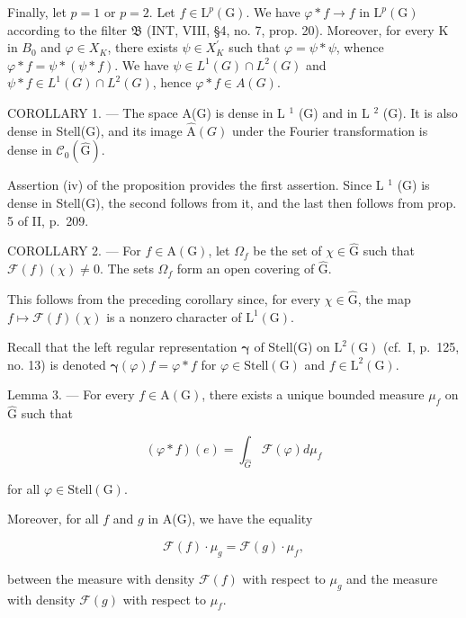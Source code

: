 Finally, let \(p=1\) or \(p=2\). Let \(f\in\mathrm{L}^{p}(\mathrm{G})\). We have \(\varphi*f\to f\) in \(\mathrm{L}^{p}(\mathrm{G})\) according to the filter \(\mathfrak{B}\) (INT, VIII, §4, no. 7, prop. 20). Moreover, for every K in \(B_{0}\) and \(\varphi\in X_{K}\), there exists \(\psi\in X_{K}^{\prime}\) such that \(\varphi=\psi*\psi\), whence \(\varphi*f=\psi*(\psi*f)\). We have \(\psi\in L^{1}(G)\cap L^{2}(G)\) and \(\psi*f\in L^{1}(G)\cap L^{2}(G)\), hence \(\varphi*f\in A(G)\).

COROLLARY 1. --- The space A(G) is dense in L \(^{1}\) (G) and in L \(^{2}\) (G). It is also dense in Stell(G), and its image \(\widehat{\mathrm{A}}(G)\) under the Fourier transformation is dense in \(\mathcal{C}_{0}(\widehat{\mathrm{G}})\).

Assertion (iv) of the proposition provides the first assertion. Since L \(^{1}\) (G) is dense in Stell(G), the second follows from it, and the last then follows from prop. 5 of II, p.~209.

COROLLARY 2. --- For \(f \in \mathrm{A}(\mathrm{G})\), let \(\Omega_f\) be the set of \(\chi \in \widehat{\mathrm{G}}\) such that \(\mathcal{F}(f)(\chi) \neq 0\). The sets \(\Omega_f\) form an open covering of \(\widehat{\mathrm{G}}\).

This follows from the preceding corollary since, for every \(\chi \in \widehat{\mathrm{G}}\), the map \(f \mapsto \mathcal{F}(f)(\chi)\) is a nonzero character of \(\mathrm{L}^1(\mathrm{G})\).

Recall that the left regular representation \(\pmb{\gamma}\) of Stell(G) on \(\mathrm{L}^2 (\mathrm{G})\) (cf.~I, p.~125, no. 13) is denoted \(\pmb{\gamma}(\varphi)f = \varphi *f\) for \(\varphi \in \mathrm{Stell}(\mathrm{G})\) and \(f\in \mathrm{L}^2 (\mathrm{G})\).

Lemma 3. --- For every \(f \in \mathrm{A}(\mathrm{G})\), there exists a unique bounded measure \(\mu_{f}\) on \(\widehat{\mathrm{G}}\) such that

\[
(\varphi * f) (e) = \int_ {\widehat {G}} \mathcal {F} (\varphi) d \mu_ {f}\tag{17}
\]

for all \(\varphi\in\mathrm{Stell}(\mathrm{G})\).

Moreover, for all \(f\) and \(g\) in A(G), we have the equality

\[
\mathcal {F} (f) \cdot \mu_ {g} = \mathcal {F} (g) \cdot \mu_ {f},\tag{18}
\]

between the measure with density \(\mathcal{F}(f)\) with respect to \(\mu_g\) and the measure with density \(\mathcal{F}(g)\) with respect to \(\mu_f\).

